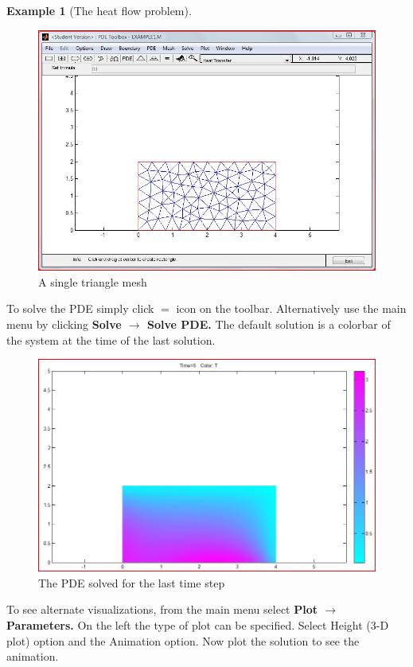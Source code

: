 \documentclass{amsart}
\theoremstyle{definition}
\newtheorem{example}{Example}
\begin{document}
\begin{example}[The heat flow problem]
\begin{figure}[h]
   \includegraphics[height = 3 in]{MeshModeExample1}
   \caption{A single triangle mesh}
\end{figure}

\pagebreak

To solve the PDE simply click $=$ icon on the toolbar. Alternatively use the main menu by clicking \textbf{Solve $\to$ Solve PDE.} The default solution is a colorbar of the system at the time of the last solution.

\begin{figure}[h]
   \includegraphics[height = 3 in]{Example1FinalGraph}
   \caption{The PDE solved for the last time step}
\end{figure} 

To see alternate visualizations, from the main menu select \textbf{Plot $\to$ Parameters.} On the left the type of plot can be specified. Select Height (3-D plot) option and the Animation option. Now plot the solution to see the animation.


\end{example}
\end{document}
